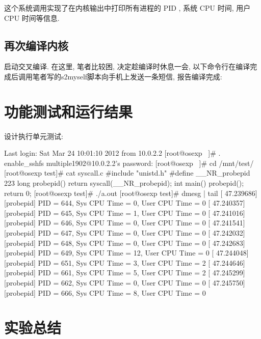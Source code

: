 \documentclass[11pt]{report}
\begin{document}
        这个系统调用实现了在内核输出中打印所有进程的 PID , 系统 CPU 时间, 用户 CPU 时间等信息.

        \subsection{再次编译内核}

            启动交叉编译. 在这里, 笔者比较困, 决定趁编译时休息一会, 以下命令行在编译完成后调用笔者写的s2myself脚本向手机上发送一条短信, 报告编译完成:


    \section{功能测试和运行结果}

            设计执行单元测试:

\begin{console}
[multiple1902 /t]%
Last login: Sat Mar 24 10:01:10 2012 from 10.0.2.2
[root@osexp ~]# . enable_sshfs
multiple1902@10.0.2.2's password:
[root@osexp ~]# cd /mnt/test/
[root@osexp test]# cat syscall.c
#include "unistd.h"
#define __NR_probepid 223
long probepid(){
    return syscall(__NR_probepid);
}
int main(){
    probepid();
    return 0;
}
[root@osexp test]# ./a.out
[root@osexp test]# dmesg | tail
[   47.239686] [probepid] PID = 644, Sys CPU Time = 0, User CPU Time = 0
[   47.240357] [probepid] PID = 645, Sys CPU Time = 1, User CPU Time = 0
[   47.241016] [probepid] PID = 646, Sys CPU Time = 0, User CPU Time = 0
[   47.241541] [probepid] PID = 647, Sys CPU Time = 0, User CPU Time = 0
[   47.242032] [probepid] PID = 648, Sys CPU Time = 0, User CPU Time = 0
[   47.242683] [probepid] PID = 649, Sys CPU Time = 12, User CPU Time = 0
[   47.244048] [probepid] PID = 651, Sys CPU Time = 3, User CPU Time = 2
[   47.244646] [probepid] PID = 661, Sys CPU Time = 5, User CPU Time = 2
[   47.245299] [probepid] PID = 662, Sys CPU Time = 0, User CPU Time = 0
[   47.245750] [probepid] PID = 666, Sys CPU Time = 8, User CPU Time = 0
\end{console}

    \section{实验总结}
\end{document}
